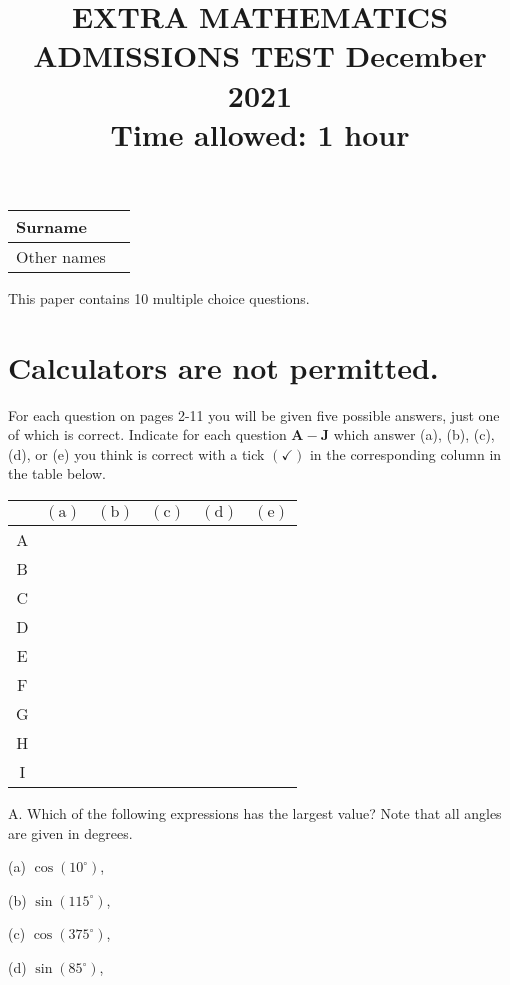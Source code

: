 \documentclass[10pt]{article}
\title{EXTRA MATHEMATICS ADMISSIONS TEST December 2021 \\
 Time allowed: 1 hour }
\author{}
\date{}
\begin{document}
\maketitle
\begin{center}
\begin{tabular}{|l|l|}
\hline
Surname &  \\
\hline
Other names &  \\
\hline
\end{tabular}
\end{center}

This paper contains 10 multiple choice questions.

\section*{Calculators are not permitted.}
For each question on pages 2-11 you will be given five possible answers, just one of which is correct. Indicate for each question $\mathbf{A}-\mathbf{J}$ which answer (a), (b), (c), (d), or (e) you think is correct with a tick $(\checkmark)$ in the corresponding column in the table below.

\begin{center}
\begin{tabular}{|c|l|l|l|l|l|}
\hline
 & $(\mathrm{a})$ & $(\mathrm{b})$ & $(\mathrm{c})$ & $(\mathrm{d})$ & $(\mathrm{e})$ \\
\hline
A &  &  &  &  &  \\
\hline
B &  &  &  &  &  \\
\hline
C &  &  &  &  &  \\
\hline
D &  &  &  &  &  \\
\hline
E &  &  &  &  &  \\
\hline
F &  &  &  &  &  \\
\hline
G &  &  &  &  &  \\
\hline
H &  &  &  &  &  \\
\hline
I &  &  &  &  &  \\
\hline
\end{tabular}
\end{center}

A. Which of the following expressions has the largest value? Note that all angles are given in degrees.

(a) $\cos \left(10^{\circ}\right)$,

(b) $\sin \left(115^{\circ}\right)$,

(c) $\cos \left(375^{\circ}\right)$,

(d) $\sin \left(85^{\circ}\right)$,
\end{document}
